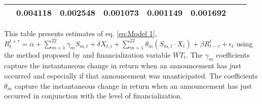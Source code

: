 \begin{sidewaystable}
{\begin{tabular}{@{}lllllllllllll@{}}
                                       & \multicolumn{2}{c}{ 0.004118 }                                                 & \multicolumn{2}{c}{ 0.002548 }                                                 & \multicolumn{2}{c}{ 0.001073 }                                                 & \multicolumn{2}{c}{ 0.001149 }                                                   & \multicolumn{2}{c}{ 0.001692 }                                                 \\ \bottomrule 
\end{tabular}
}
\begin{tablenotes}\item 
    \singlespacing
    \footnotesize
    This table presents estimates of eq. \ref{eq:Model 1}, $R_{t}^{t+\tau}=\alpha+\sum_{m=1}^{22} \gamma_m S_{m,t}+ \delta X_{t,i} + \sum_{m=1}^{22} \theta_m (S_{m,t} \cdot X_t)+\beta R_{t-\tau}^{t}+\epsilon_{t}$ using the method proposed by \citet{kurov2019price} and financialization variable $WT_t$. The $\gamma_m$ coefficients capture the instantaneous change in return when an announcement has just occurred and especially if that announcement was unanticipated. The coefficients $\theta_m$ capture the instantaneous change in return when an announcement has just occurred in conjunction with the level of financialization.
\end{tablenotes}
\end{sidewaystable}


